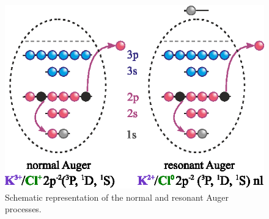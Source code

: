 \begin{figure}
\includegraphics{figures/auger_process.eps}
\caption{Schematic representation of the normal and resonant Auger processes.}
\label{fg:auger}
\end{figure}